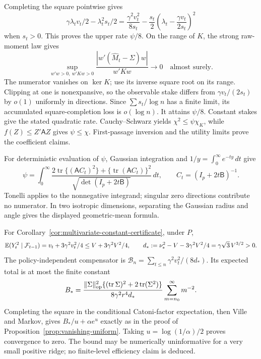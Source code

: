 Completing the square pointwise gives
\[
 \gamma\lambda_tv_t/2-\lambda_t^2s_t/2
 =\frac{\gamma^2v_t^2}{8s_t}
     -\frac{s_t}{2}\left(\lambda_t-\frac{\gamma v_t}{2s_t}\right)^2
\]
when $s_t>0$. This proves the upper rate $\psi/8$. On the range of $K$,
the strong raw-moment law gives
\[
 \sup_{w'w>0,\ w'Kw>0}
 \frac{|w'(\widehat M_t-\Sigma)w|}{w'Kw}\to0
 \quad\text{almost surely}.
\]
The numerator vanishes on $\ker K$; use its inverse square root on its
range. Clipping at one is nonexpansive, so the observable stake differs from
$\gamma v_t/(2s_t)$ by $o(1)$ uniformly in directions. Since
$\sum s_t/\log n$ has a finite limit, its accumulated square-completion loss
is $o(\log n)$. It attains $\psi/8$. Constant stakes give the stated
quadratic rate. Cauchy--Schwarz yields
$\chi^2\le\psi\chi_K$, while $f(Z)\le Z'\mathsf A Z$ gives $\psi\le\chi$.
First-passage inversion and the utility limits prove the coefficient claims.

For deterministic evaluation of $\psi$, Gaussian integration and
$1/y=\int_0^\infty e^{-ty}\,dt$ give
\[
 \psi=\int_0^\infty
 \frac{2\operatorname{tr}\{(\mathsf A C_t)^2\}
       +\{\operatorname{tr}(\mathsf A C_t)\}^2}
      {\sqrt{\det(I_p+2t\mathsf B)}}\,dt,\qquad
 C_t=(I_p+2t\mathsf B)^{-1}.
\]
Tonelli applies to the nonnegative integrand; singular zero directions
contribute no numerator. In two isotropic dimensions, separating the
Gaussian radius and angle gives the displayed geometric-mean formula.

For Corollary~\ref{cor:multivariate-constant-certificate}, under $P$,
\[
 \mathbb E(Y_t^2\mid\mathcal F_{t-1})=v_t+3\gamma^2v_t^2/4
       \le V+3\gamma^2V^2/4,
 \qquad d_*:=\nu_*^2-V-3\gamma^2V^2/4
                 =\gamma\sqrt3\,V^{3/2}>0.
\]
The policy-independent compensator is
$\mathcal B_n=\sum_{t\le n}\gamma^2v_t^2/(8d_*)$. Its expected total is
at most the finite constant
\[
 B_*=
 \frac{\lVert\Sigma\rVert_{\mathrm{op}}^2
       \{(\operatorname{tr}\Sigma)^2+2\operatorname{tr}(\Sigma^2)\}}
      {8\gamma^2r^4d_*}
       \sum_{m=n_0}^{\infty}m^{-2}.
\]
Completing the square in the conditional Catoni-factor expectation, then
Ville and Markov, gives $B_*/u+\alpha e^u$ exactly as in the proof of
Proposition~\ref{prop:vanishing-uniform}. Taking $u=\log(1/\alpha)/2$
proves convergence to zero. The bound may be numerically uninformative for
a very small positive ridge; no finite-level efficiency claim is deduced.
